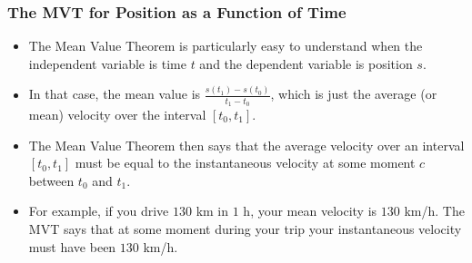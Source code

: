 \documentclass[serif,ignorenonframetext]{beamer}
\newcommand{\ds}{\displaystyle}
\begin{document}
\begin{frame}
\begin{columns}
  \end{columns}
\end{frame}

\begin{frame}
  \frametitle{The MVT for Position as a Function of Time}
  \begin{itemize}[<+->]
  \item The Mean Value Theorem is particularly easy to understand
    when the independent variable is time $t$ and the dependent
    variable is position $s$.
  \item In that case, the mean value is $\ds \frac{s(t_1)-s(t_0)}{t_1-t_0}$,
    which is just the average (or mean) velocity over the interval $[t_0,t_1]$.
  \item The Mean Value Theorem then says that the average velocity over
    an interval $[t_0,t_1]$ must be equal to the instantaneous velocity
    at some moment $c$ between $t_0$ and $t_1$.
  \item For example, if you drive $130$ km in $1$ h, your mean velocity
    is $130$ km/h.  The MVT says that at some moment during your trip your
    instantaneous velocity must have been $130$ km/h.
  \end{itemize}
\end{frame}
\end{document}

